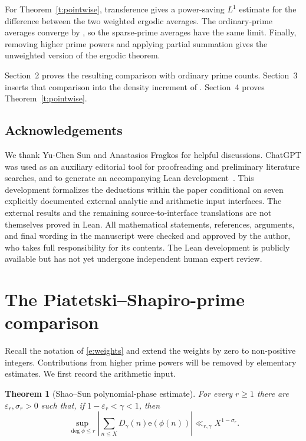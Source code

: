 \documentclass[12pt]{amsart}
\newcommand{\1}{\mathbf 1}
\newcommand{\e}{\mathrm e}
\newtheorem{theorem}{Theorem}[section]
\begin{document}
For Theorem~\ref{t:pointwise}, transference gives a power-saving
$L^1$ estimate for the difference between the two weighted ergodic
averages.  The ordinary-prime averages
converge by \cite[Theorem~1.1]{MirekWanWright}, so the sparse-prime
averages have the same limit. Finally, removing higher prime powers
and applying partial summation gives the unweighted version of the ergodic theorem. 


Section~2 proves the resulting comparison with ordinary prime counts.
Section~3 inserts that comparison into the density increment of
\cite{KMTT}.  Section~4 proves Theorem~\ref{t:pointwise}.

\subsection*{Acknowledgements}

We thank Yu-Chen Sun and Anastasios Fragkos for helpful discussions.
ChatGPT was used as an auxiliary editorial tool for proofreading
and preliminary literature searches, and to generate an accompanying
Lean development~\cite{MousaviPSFormalization}. This development formalizes
the deductions within the paper conditional on seven explicitly
documented external analytic and arithmetic input interfaces.
The external results and the remaining source-to-interface
translations are not themselves proved in Lean.
All mathematical statements, references, arguments, and final wording
in the manuscript were checked and approved by the author, who takes
full responsibility for its contents. The Lean development is
publicly available but has not yet undergone independent human
expert review.


\section{The Piatetski--Shapiro-prime comparison}

Recall the notation of \eqref{e:weights} and extend the weights
by zero to non-positive integers. Contributions from higher prime
powers will be removed by elementary estimates.
We first record the arithmetic input. 

\begin{theorem}[Shao--Sun polynomial-phase estimate]
\label{t:shao-sun}
For every $r\geq1$ there are $\varepsilon_r,\sigma_r>0$ such that, if
$1-\varepsilon_r<\gamma<1$, then
\begin{equation}\label{e:shao-sun}
 \sup_{\deg\phi\leq r}
 \left|\sum_{n\leq X}D_\gamma(n)\e(\phi(n))\right|
 \ll_{r,\gamma}X^{1-\sigma_r}.
\end{equation}
\end{theorem}
\end{document}
